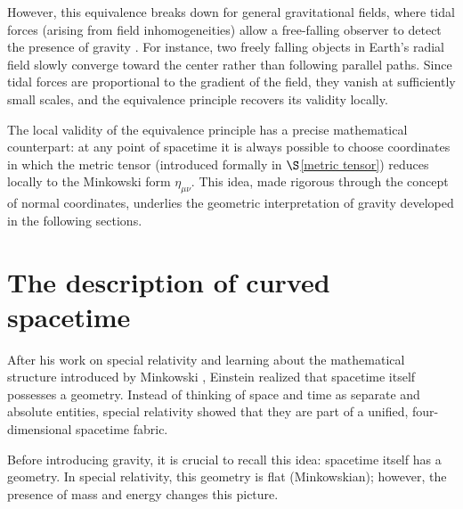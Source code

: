 However, this equivalence breaks down for general gravitational fields, where tidal forces (arising from field inhomogeneities) allow a free-falling observer to detect the presence of gravity \cite{LlibreBertJanssen}. For instance, two freely falling objects in Earth's radial
field slowly converge toward the center rather than following parallel paths. Since tidal forces are proportional to the gradient of the field, they vanish at sufficiently small scales, and the equivalence principle recovers its validity locally.

\begin{center}
\begin{minipage}{0.9\textwidth}
\begin{center}
\setlength{\fboxsep}{7pt}
\setlength{\fboxrule}{0.75pt}
\end{center}
\end{minipage}
\end{center}


The local validity of the equivalence principle has a precise mathematical counterpart: at any point of spacetime it is always possible to choose coordinates in which the metric tensor (introduced formally in $\S$\ref{metric tensor}) reduces locally to the Minkowski form $\eta_{\mu\nu}$. This idea, made rigorous through the concept of normal coordinates, underlies the geometric interpretation of gravity developed in the following sections.

\section{The description of curved spacetime}


After his work on special relativity and learning about the mathematical structure introduced by Minkowski \cite{Minkowski}, Einstein realized that spacetime itself possesses a geometry. Instead of thinking of space and time as separate and absolute entities, special relativity showed that they are part of a unified, four-dimensional spacetime fabric. 

Before introducing gravity, it is crucial to recall this idea: spacetime itself has a geometry. In special relativity, this geometry is flat (Minkowskian); however, the presence of mass and energy changes this picture.

